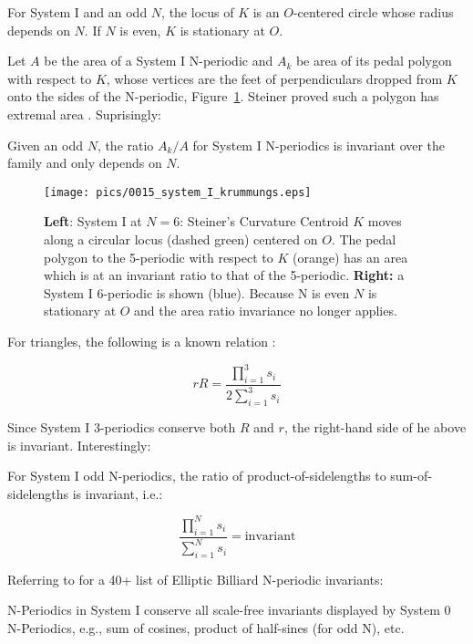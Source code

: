 \begin{conjecture}
For System I and an odd $N$, the locus of $K$ is an $O$-centered circle whose radius depends on $N$. If $N$ is even, $K$ is stationary at $O$.
\end{conjecture}

Let $A$ be the area of a System I N-periodic and $A_k$ be area of its pedal polygon with respect to $K$, whose vertices are the feet of perpendiculars dropped from $K$ onto the sides of the N-periodic, Figure~\ref{fig:ellipse-circle-krummungs}. Steiner proved such a polygon has extremal area \cite{steiner1838}. Suprisingly:

\begin{conjecture}
Given an odd $N$, the ratio $A_k/A$ for System I N-periodics is invariant over the family and only depends on $N$.
\end{conjecture}

\begin{figure}
    \centering
\texttt{[image: pics/0015\_system\_I\_krummungs.eps]}
    \caption{\textbf{Left}: System I at $N=6$: Steiner's Curvature Centroid $K$ moves along a circular locus (dashed green) centered on $O$. The pedal polygon to the 5-periodic with respect to $K$ (orange) has an area which is at an invariant ratio to that of the 5-periodic. \textbf{Right:} a System I  6-periodic is shown (blue). Because N is even $N$ is stationary at $O$ and the area ratio invariance no longer applies.}
    \label{fig:ellipse-circle-krummungs}
\end{figure}

For triangles, the following is a known relation \cite[Equation 3]{mw}:

\[ r R = \frac{\prod_{i=1}^3{s_i}}{2\sum_{i=1}^3{s_i}} \]

Since System I 3-periodics conserve both $R$ and $r$, the right-hand side of he above is invariant. Interestingly:

\begin{conjecture}
For System I odd N-periodics, the ratio of product-of-sidelengths to sum-of-sidelengths is invariant, i.e.:

\[ \frac{\prod_{i=1}^N{s_i}}{\sum_{i=1}^N{s_i}} = \text{invariant} \] 
\end{conjecture}

Referring to  \cite{reznik2020-forty} for a 40+ list of Elliptic Billiard N-periodic invariants:

\begin{conjecture}
N-Periodics in System I conserve all scale-free invariants displayed by System 0 N-Periodics, e.g., sum of cosines, product of half-sines (for odd N), etc.
\end{conjecture}
